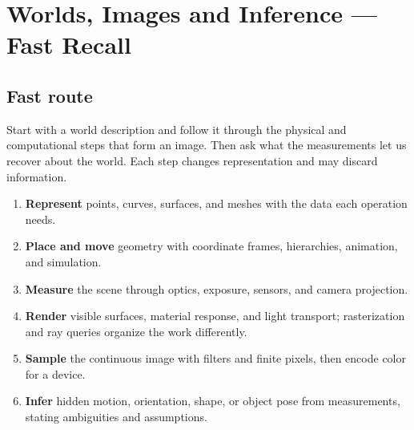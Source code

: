 \hypertarget{appendix-a8f634b076b5}{}\label{referencestart:appendix-a8f634b076b5}
\section{Worlds, Images and Inference --- Fast Recall}\label{appendix-a8f634b076b5-worlds-images-and-inference-fast-recall}

\hypertarget{appendix-a8f634b076b5-worlds-images-and-inference-fast-recall}{}

\subsection{Fast route}\label{appendix-a8f634b076b5-fast-route}

\hypertarget{appendix-a8f634b076b5-fast-route}{}

Start with a world description and follow it through the physical and computational steps that form an image. Then ask what the measurements let us recover about the world. Each step changes representation and may discard information.


\begin{enumerate}
\def\labelenumi{\arabic{enumi}.}
\tightlist
\item
  \textbf{Represent} points, curves, surfaces, and meshes with the data each operation needs.
\item
  \textbf{Place and move} geometry with coordinate frames, hierarchies, animation, and simulation.
\item
  \textbf{Measure} the scene through optics, exposure, sensors, and camera projection.
\item
  \textbf{Render} visible surfaces, material response, and light transport; rasterization and ray queries organize the work differently.
\item
  \textbf{Sample} the continuous image with filters and finite pixels, then encode color for a device.
\item
  \textbf{Infer} hidden motion, orientation, shape, or object pose from measurements, stating ambiguities and assumptions.
\end{enumerate}

